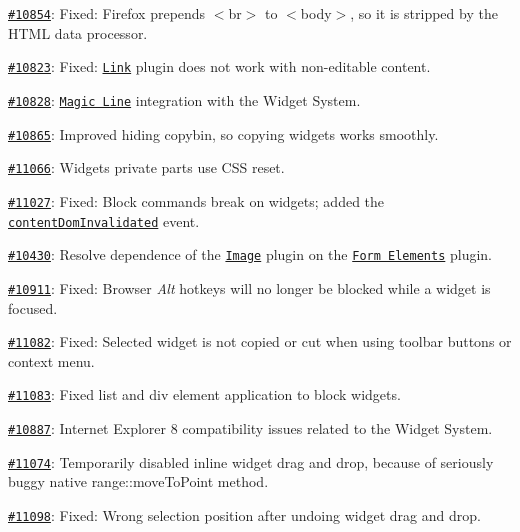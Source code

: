 {\begin{DoxyItemize}
\item \href{http://dev.ckeditor.com/ticket/10854}{\tt \#10854}\+: Fixed\+: Firefox prepends {\ttfamily $<$br$>$} to {\ttfamily $<$body$>$}, so it is stripped by the H\+T\+ML data processor.
\item \href{http://dev.ckeditor.com/ticket/10823}{\tt \#10823}\+: Fixed\+: \href{http://ckeditor.com/addon/link}{\tt Link} plugin does not work with non-\/editable content.
\item \href{http://dev.ckeditor.com/ticket/10828}{\tt \#10828}\+: \href{http://ckeditor.com/addon/magicline}{\tt Magic Line} integration with the Widget System.
\item \href{http://dev.ckeditor.com/ticket/10865}{\tt \#10865}\+: Improved hiding copybin, so copying widgets works smoothly.
\item \href{http://dev.ckeditor.com/ticket/11066}{\tt \#11066}\+: Widget\textquotesingle{}s private parts use C\+SS reset.
\item \href{http://dev.ckeditor.com/ticket/11027}{\tt \#11027}\+: Fixed\+: Block commands break on widgets; added the \href{http://docs.ckeditor.com/#!/api/CKEDITOR.editor-event-contentDomInvalidated}{\tt {\ttfamily content\+Dom\+Invalidated}} event.
\item \href{http://dev.ckeditor.com/ticket/10430}{\tt \#10430}\+: Resolve dependence of the \href{http://ckeditor.com/addon/image}{\tt Image} plugin on the \href{http://ckeditor.com/addon/forms}{\tt Form Elements} plugin.
\item \href{http://dev.ckeditor.com/ticket/10911}{\tt \#10911}\+: Fixed\+: Browser {\itshape Alt} hotkeys will no longer be blocked while a widget is focused.
\item \href{http://dev.ckeditor.com/ticket/11082}{\tt \#11082}\+: Fixed\+: Selected widget is not copied or cut when using toolbar buttons or context menu.
\item \href{http://dev.ckeditor.com/ticket/11083}{\tt \#11083}\+: Fixed list and div element application to block widgets.
\item \href{http://dev.ckeditor.com/ticket/10887}{\tt \#10887}\+: Internet Explorer 8 compatibility issues related to the Widget System.
\item \href{http://dev.ckeditor.com/ticket/11074}{\tt \#11074}\+: Temporarily disabled inline widget drag and drop, because of seriously buggy native {\ttfamily range\+::move\+To\+Point} method.
\item \href{http://dev.ckeditor.com/ticket/11098}{\tt \#11098}\+: Fixed\+: Wrong selection position after undoing widget drag and drop.

\end{DoxyItemize}}
